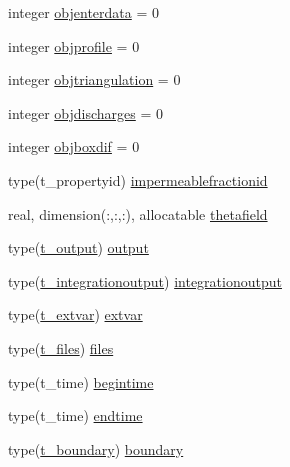 \begin{DoxyCompactItemize}
\item 
integer \mbox{\hyperlink{structmoduleporousmedia_1_1t__porousmedia_a2afdf498ec6f31dddb814995982549ae}{objenterdata}} = 0
\item 
integer \mbox{\hyperlink{structmoduleporousmedia_1_1t__porousmedia_a38a2b88ea5b722e7a17581685b5331f8}{objprofile}} = 0
\item 
integer \mbox{\hyperlink{structmoduleporousmedia_1_1t__porousmedia_a485356183625b54a40783dbe4420bf95}{objtriangulation}} = 0
\item 
integer \mbox{\hyperlink{structmoduleporousmedia_1_1t__porousmedia_aff2b822d107572cb07486c56eb14552a}{objdischarges}} = 0
\item 
integer \mbox{\hyperlink{structmoduleporousmedia_1_1t__porousmedia_a5bfaf572ef7db66e1d009b915c43a32d}{objboxdif}} = 0
\item 
type(t\+\_\+propertyid) \mbox{\hyperlink{structmoduleporousmedia_1_1t__porousmedia_a8741f5e5195e8c87c4a6e7ceec27fcc1}{impermeablefractionid}}
\item 
real, dimension(\+:,\+:,\+:), allocatable \mbox{\hyperlink{structmoduleporousmedia_1_1t__porousmedia_af85dd5b858afbfd59e5fcac91e7ba81a}{thetafield}}
\item 
type(\mbox{\hyperlink{structmoduleporousmedia_1_1t__output}{t\+\_\+output}}) \mbox{\hyperlink{structmoduleporousmedia_1_1t__porousmedia_acd0d85beab2fb8e865028f64ef671c63}{output}}
\item 
type(\mbox{\hyperlink{structmoduleporousmedia_1_1t__integrationoutput}{t\+\_\+integrationoutput}}) \mbox{\hyperlink{structmoduleporousmedia_1_1t__porousmedia_a8e17d0f4dc4076b6c92b6b1021eb2140}{integrationoutput}}
\item 
type(\mbox{\hyperlink{structmoduleporousmedia_1_1t__extvar}{t\+\_\+extvar}}) \mbox{\hyperlink{structmoduleporousmedia_1_1t__porousmedia_a2b957ddeb0a2c3d24acfd38d771d7088}{extvar}}
\item 
type(\mbox{\hyperlink{structmoduleporousmedia_1_1t__files}{t\+\_\+files}}) \mbox{\hyperlink{structmoduleporousmedia_1_1t__porousmedia_a6c1201a3e38ec62a6015028705475347}{files}}
\item 
type(t\+\_\+time) \mbox{\hyperlink{structmoduleporousmedia_1_1t__porousmedia_a86a0087077d698ccd986ecae6d3bf083}{begintime}}
\item 
type(t\+\_\+time) \mbox{\hyperlink{structmoduleporousmedia_1_1t__porousmedia_a30c98a4f9aa8514deef4c42523d13444}{endtime}}
\item 
type(\mbox{\hyperlink{structmoduleporousmedia_1_1t__boundary}{t\+\_\+boundary}}) \mbox{\hyperlink{structmoduleporousmedia_1_1t__porousmedia_a2c25fe66da3ded29f35c6b67ecb46cd7}{boundary}}

\end{DoxyCompactItemize}
